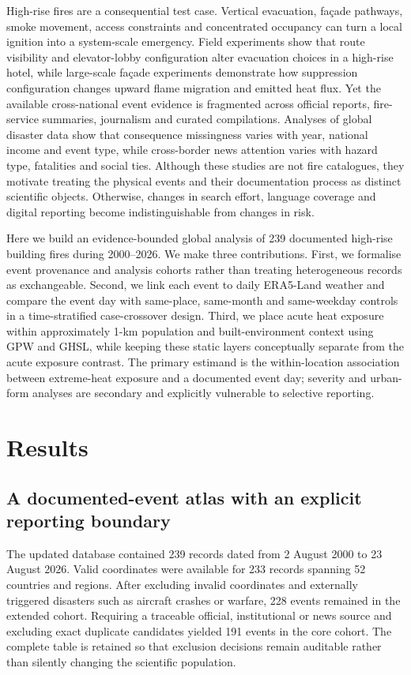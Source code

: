\documentclass[11pt]{article}
\begin{document}
High-rise fires are a consequential test case. Vertical evacuation, façade pathways, smoke movement, access constraints and concentrated occupancy can turn a local ignition into a system-scale emergency. Field experiments show that route visibility and elevator-lobby configuration alter evacuation choices in a high-rise hotel\citep{Mossberg2021}, while large-scale façade experiments demonstrate how suppression configuration changes upward flame migration and emitted heat flux\citep{Meraner2024}. Yet the available cross-national event evidence is fragmented across official reports, fire-service summaries, journalism and curated compilations. Analyses of global disaster data show that consequence missingness varies with year, national income and event type, while cross-border news attention varies with hazard type, fatalities and social ties\citep{Jones2022,Fetzer2026}. Although these studies are not fire catalogues, they motivate treating the physical events and their documentation process as distinct scientific objects. Otherwise, changes in search effort, language coverage and digital reporting become indistinguishable from changes in risk.

Here we build an evidence-bounded global analysis of 239 documented high-rise building fires during 2000--2026. We make three contributions. First, we formalise event provenance and analysis cohorts rather than treating heterogeneous records as exchangeable. Second, we link each event to daily ERA5-Land weather and compare the event day with same-place, same-month and same-weekday controls in a time-stratified case-crossover design. Third, we place acute heat exposure within approximately 1-km population and built-environment context using GPW and GHSL, while keeping these static layers conceptually separate from the acute exposure contrast. The primary estimand is the within-location association between extreme-heat exposure and a documented event day; severity and urban-form analyses are secondary and explicitly vulnerable to selective reporting.

\section*{Results}
\subsection*{A documented-event atlas with an explicit reporting boundary}
The updated database contained 239 records dated from 2 August 2000 to 23 August 2026. Valid coordinates were available for 233 records spanning 52 countries and regions. After excluding invalid coordinates and externally triggered disasters such as aircraft crashes or warfare, 228 events remained in the extended cohort. Requiring a traceable official, institutional or news source and excluding exact duplicate candidates yielded 191 events in the core cohort. The complete table is retained so that exclusion decisions remain auditable rather than silently changing the scientific population.
\end{document}
